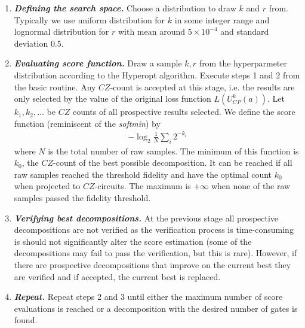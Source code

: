 \documentclass[amsfonts, amssymb, aps, nofootinbib]{revtex4-2}
\begin{document}
\begin{enumerate}
\item \textit{\textbf{Defining the search space.}} Choose a distribution to draw $k$ and $r$ from. Typically we use uniform distribution for $k$ in some integer range and lognormal distribution for $r$ with mean around $5\times 10^{-4}$ and standard deviation $0.5$.
\item \textit{\textbf{Evaluating score function.}} Draw a sample $k, r$ from the hyperparmeter distribution according to the Hyperopt algorithm. Execute steps 1 and 2 from the basic routine. Any $CZ$-count is accepted at this stage, i.e. the results are only selected by the value of the original loss function $L(U_{CP}^k(a))$. Let $k_1, k_2,\dots$ be $CZ$ counts of all prospective results selected. We define the score function (reminiscent of the \textit{softmin}) by 
\begin{align}
-\log_2\frac{1}{N}\sum_{i}2^{-k_i}
\end{align}
where $N$ is the total number of raw samples. The minimum of this function is $k_0$, the $CZ$-count of the best possible decomposition. It can be reached if all raw samples reached the threshold fidelity and have the optimal count $k_0$ when projected to $CZ$-circuits. The maximum is $+\infty$ when none of the raw samples passed the fidelity threshold.
\item \textit{\textbf{Verifying best decompositions.}} At the previous stage all prospective decompositions are not verified as the verification process is time-consuming is should not significantly alter the score estimation (some of the decompositions may fail to pass the verification, but this is rare). However, if there are prospective decompositions that improve on the current best they are verified and if accepted, the current best is replaced.

\item \textit{\textbf{Repeat.}} Repeat steps 2 and 3 until either the maximum number of score evaluations is reached or a decomposition with the desired number of gates is found.
\end{enumerate}
\end{document}
